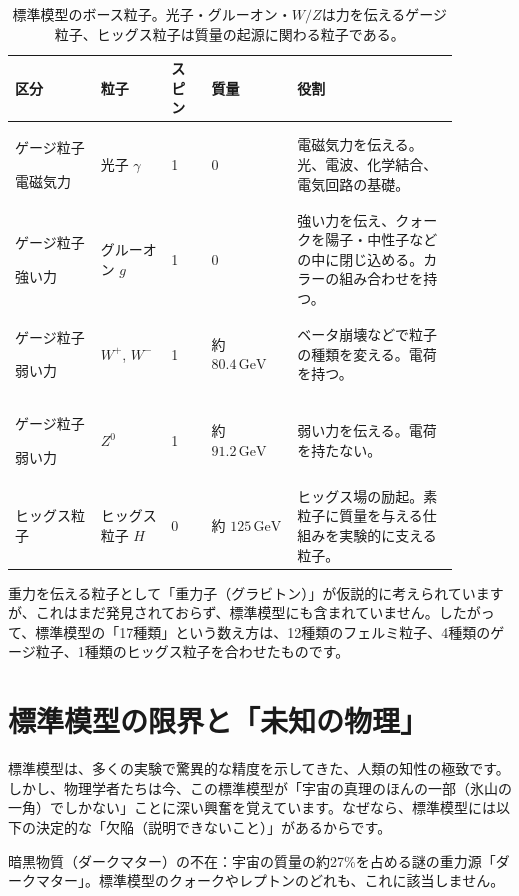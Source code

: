 \begin{table}[htbp]
\centering
\small
\setlength{\tabcolsep}{4pt}
\renewcommand{\arraystretch}{1.25}
\begin{tabular}{p{0.17\linewidth}p{0.14\linewidth}p{0.08\linewidth}p{0.17\linewidth}p{0.32\linewidth}}
\hline
区分 & 粒子 & スピン & 質量 & 役割 \\
\hline
ゲージ粒子\par 電磁気力 & 光子 \(\gamma\) & 1 & 0 & 電磁気力を伝える。光、電波、化学結合、電気回路の基礎。 \\
ゲージ粒子\par 強い力 & グルーオン \(g\) & 1 & 0 & 強い力を伝え、クォークを陽子・中性子などの中に閉じ込める。カラーの組み合わせを持つ。 \\
ゲージ粒子\par 弱い力 & \(W^+\), \(W^-\) & 1 & 約 \(80.4\,\mathrm{GeV}\) & ベータ崩壊などで粒子の種類を変える。電荷を持つ。 \\
ゲージ粒子\par 弱い力 & \(Z^0\) & 1 & 約 \(91.2\,\mathrm{GeV}\) & 弱い力を伝える。電荷を持たない。 \\
ヒッグス粒子 & ヒッグス粒子 \(H\) & 0 & 約 \(125\,\mathrm{GeV}\) & ヒッグス場の励起。素粒子に質量を与える仕組みを実験的に支える粒子。 \\
\hline
\end{tabular}
\caption{標準模型のボース粒子。光子・グルーオン・\(W/Z\)は力を伝えるゲージ粒子、ヒッグス粒子は質量の起源に関わる粒子である。}
\end{table}

重力を伝える粒子として「重力子（グラビトン）」が仮説的に考えられていますが、これはまだ発見されておらず、標準模型にも含まれていません。したがって、標準模型の「17種類」という数え方は、12種類のフェルミ粒子、4種類のゲージ粒子、1種類のヒッグス粒子を合わせたものです。

\section{標準模型の限界と「未知の物理」}

標準模型は、多くの実験で驚異的な精度を示してきた、人類の知性の極致です。しかし、物理学者たちは今、この標準模型が「宇宙の真理のほんの一部（氷山の一角）でしかない」ことに深い興奮を覚えています。なぜなら、標準模型には以下の決定的な「欠陥（説明できないこと）」があるからです。

暗黒物質（ダークマター）の不在：宇宙の質量の約27\%を占める謎の重力源「ダークマター」。標準模型のクォークやレプトンのどれも、これに該当しません。

